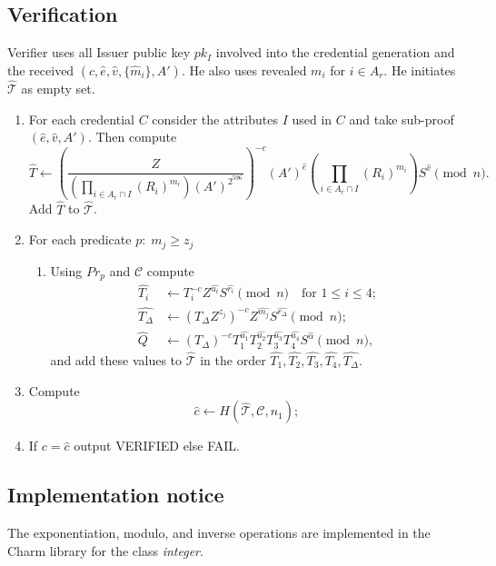 \documentclass[a4paper]{article}
\begin{document}
\subsection{Verification}
Verifier uses all Issuer public key $pk_I$ involved into the credential generation and  the received $(c,\widehat{e},\widehat{v},\{\widehat{m}_i\},A')$. He also uses revealed 
$m_i$ for $i\in A_r$. He initiates $\widehat{\mathcal{T}}$ as empty set.



\begin{enumerate}
\item For each credential $C$ consider the  attributes $I$ used in $C$ and take sub-proof $(\widehat{e},\widehat{v},A')$. Then compute 
\begin{equation}\label{eq:that}
 \widehat{T} \leftarrow \left(
    \frac{Z}
    { \left(
        \prod_{i \in A_r\cap I}(R_i)^{m_i}
    \right)
    (A')^{2^{596}}
    }\right)^{-c}
    (A')^{\widehat{e}}
    \left(\prod_{i\in A_{\overline{r}}\cap I}(R_i)^{\widehat{m_i}}\right)
    S^{\widehat{v}}\pmod{n}.
\end{equation}
Add $\widehat{T}$ to $\widehat{\mathcal{T}}$.
\item For each predicate $p:\;m_j\geq z_j$
\begin{enumerate}
\item Using $Pr_p$ and $\mathcal{C}$ compute 
\begin{align}
\widehat{T_i} &\leftarrow T_i^{-c}Z^{\widehat{u_i}} S^{\widehat{r_i}}\pmod{n} \quad \text{for }1\leq i \leq 4;\label{eq:pr2}\\
\widehat{T_{\Delta}} &\leftarrow \left(T_{\Delta}Z^{z_j}\right)^{-c}Z^{\widehat{m_j}}S^{\widehat{r_{\Delta}}}\pmod{n};\label{eq:pr1}\\
\widehat{Q}&\leftarrow (T_{\Delta})^{-c}T_1^{\widehat{u_1}}T_2^{\widehat{u_2}}T_3^{\widehat{u_3}}T_4^{\widehat{u_4}}
S^{\widehat{\alpha}}\pmod{n}\label{eq:pr3},
\end{align}
and add these values to  $\widehat{\mathcal{T}}$ in the order $\widehat{T_1},\widehat{T_2} ,\widehat{T_3},\widehat{T_4},\widehat{T_{\Delta}}    $.
\end{enumerate}
\item Compute $$
\widehat{c} \leftarrow H(\widehat{\mathcal{T}},\mathcal{C},n_1);
$$
\item If $c=\widehat{c}$ output VERIFIED else FAIL.
\end{enumerate}

\subsection{Implementation notice}
The exponentiation, modulo, and inverse operations are implemented in the Charm library for the class \textsl{integer}.
\end{document}
